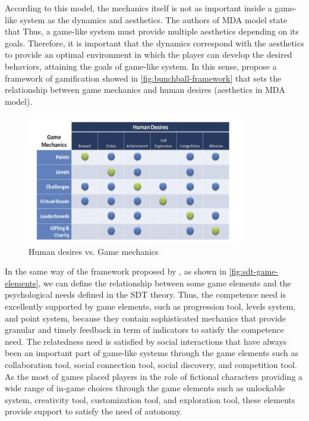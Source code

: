 According to this model, the mechanics itself is not as important inside a game-like system as the dynamics and aesthetics. The authors of MDA model state that  Thus, a game-like system must provide multiple aesthetics depending on its goals. Therefore, it is important that the dynamics correspond with the aesthetics to provide an optimal environment in which the player can develop the desired behaviors, attaining the goals of game-like system. In this sense,  propose a framework of gamification showed in \autoref{fig:bunchball-framework} that sets the relationship between game mechanics and human desires (aesthetics in MDA model).

\begin{figure}[htb]
 \caption{Human desires vs. Game mechanics}
 \label{fig:bunchball-framework}
 \centering
 \includegraphics[width=0.85\textwidth]{images/chap-general-background/bunchball-framework.png}
\end{figure}


In the same way of the framework proposed by , as shown in \autoref{fig:sdt-game-elements}, we can define the relationship between some game elements and the psychological needs defined in the SDT theory. Thus, the competence need is excellently supported by game elements, such as progression tool, levels system, and point system, because they contain sophisticated mechanics that provide granular and timely feedback in term of indicators to satisfy the competence need. The relatedness need is satisfied by social interactions that have always been an important part of game-like systems through the game elements such as collaboration tool, social connection tool, social discovery, and competition tool. As the most of games placed players in the role of fictional characters providing a wide range of in-game choices through the game elements such as unlockable system, creativity tool, customization tool, and exploration tool, these elements provide support to satisfy the need of autonomy.

